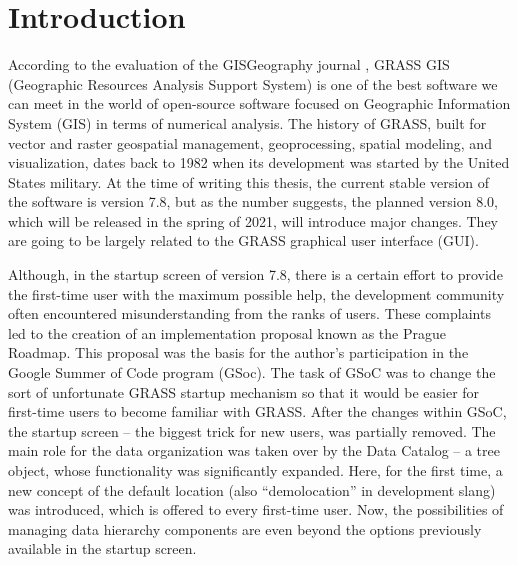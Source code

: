 \documentclass[a4paper,10pt,twoside]{article}
\begin{document}
\newpage
\vspace*{-1cm}
\pagestyle{fancy}
\section{Introduction}
\large
\setcounter{page}{13}  %

\noindent According to the evaluation of the GISGeography journal \cite{gisgeography}, GRASS GIS (Geographic Resources Analysis Support System) is one of the best software we can meet in the world of open-source software focused on Geographic Information System (GIS) in terms of numerical analysis. The history of GRASS, built for vector and raster geospatial management, geoprocessing, spatial modeling, and visualization, dates back to 1982 when its development was started by the United States military. At the time of writing this thesis, the current stable version of the software is version 7.8, but as the number suggests, the planned version 8.0, which will be released in the spring of 2021, will introduce major changes. They are going to be largely related to the GRASS graphical user interface (GUI).

Although, in the startup screen of version 7.8, there is a certain effort to provide the first-time user with the maximum possible help, the development community often encountered misunderstanding from the ranks of users. These complaints led to the creation of an implementation proposal known as the Prague Roadmap. This proposal was the basis for the author's participation in the Google Summer of Code program (GSoc). The task of GSoC was to change the sort of unfortunate GRASS startup mechanism so that it would be easier for first-time users to become familiar with GRASS. After the changes within GSoC, the startup screen --  the biggest trick for new users, was partially removed. The main role for the data organization was taken over by the Data Catalog -- a tree object, whose functionality was significantly expanded. Here, for the first time, a new concept of the default location (also ``demolocation'' in development slang) was introduced, which is offered to every first-time user. Now, the possibilities of managing data hierarchy components are even beyond the options previously available in the startup screen. 
\end{document}
